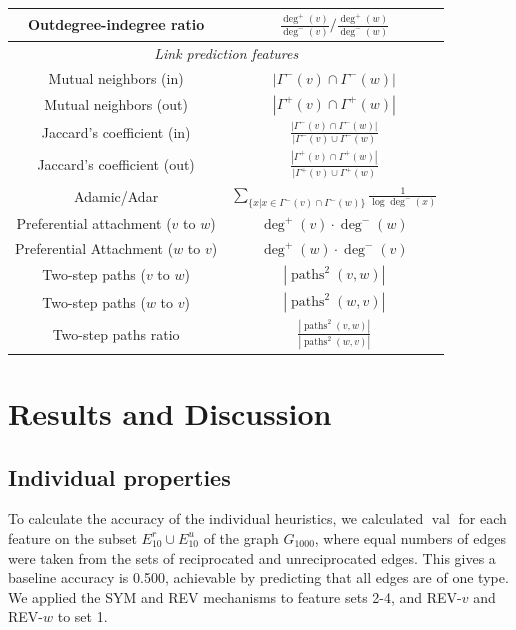 \documentclass[conference]{IEEEtran}
\begin{document}
\begin{table}[!t]
\begin{tabular}{|c||c|}
\hline
Outdegree-indegree ratio & $\frac{\deg^+(v)}{\deg^-(v)} / \frac{\deg^+(w)}{\deg^-(w)} $ \\
\hline
\multicolumn{2}{|c|}{\emph{Link prediction features}} \\
\hline
Mutual neighbors (in) & $|\Gamma^-(v) \cap \Gamma^-(w)|$ \\
Mutual neighbors (out) & $|\Gamma^+(v) \cap \Gamma^+(w)|$ \\
\hline
Jaccard's coefficient (in) & $\frac{|\Gamma^-(v) \cap \Gamma^-(w)|}{|\Gamma^-(v) \cup \Gamma^-(w)}$ \\
Jaccard's coefficient (out) & $\frac{|\Gamma^+(v) \cap \Gamma^+(w)|}{|\Gamma^+(v) \cup \Gamma^+(w)}$ \\
\hline
Adamic/Adar & $\sum_{\{x|x \in \Gamma^-(v) \cap \Gamma^-(w)\}} \frac{1}{\log{\deg^-(x)}}$ \\
\hline
Preferential attachment ($v$ to $w$) & $\deg^+(v)\cdot \deg^-(w)$ \\
Preferential Attachment ($w$ to $v$) & $\deg^+(w)\cdot \deg^-(v)$ \\
\hline
Two-step paths ($v$ to $w$) & $ |\operatorname{paths}^2(v,w)|$ \\
Two-step paths ($w$ to $v$) & $ |\operatorname{paths}^2(w,v)|$ \\
\hline
Two-step paths ratio & $\frac{|\operatorname{paths}^2(v,w)|}{|\operatorname{paths}^2(w,v)|}$ \\
\hline
\end{tabular}
\end{table}

\section{Results and Discussion}

\subsection{Individual properties}
To calculate the accuracy of the individual heuristics, we calculated $\operatorname{val}$ for each feature on the subset $E_{10}^r \cup E_{10}^u$ of the graph $G_{1000}$, where equal numbers of edges were taken from the sets of reciprocated and unreciprocated edges. 
This gives a baseline accuracy is 0.500, achievable by predicting that all edges are of one type. 
We applied the SYM and REV mechanisms to feature sets 2-4, and REV-$v$ and REV-$w$ to set 1.
\end{document}
